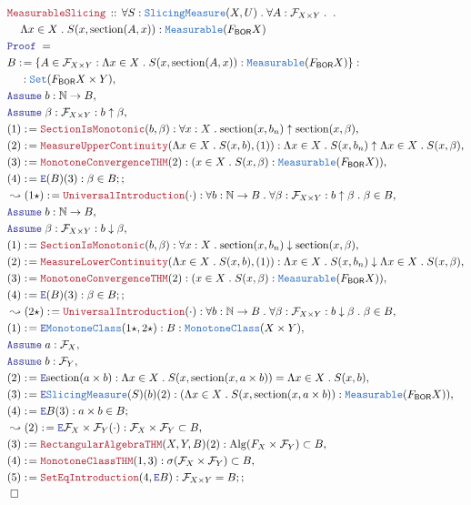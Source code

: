 \documentclass[12pt]{scrartcl}
\newcommand{\TYPE}[1]{\textcolor{NavyBlue}{\mathtt{#1}}}
\newcommand{\LOGIC}[1]{\textcolor{Blue}{\mathtt{#1}}}
\newcommand{\THM}[1]{\textcolor{Maroon}{\mathtt{#1}}}
\renewcommand{\.}{\; . \;}
\newcommand{\de}{: \kern 0.1pc =}
\newcommand{\Theorem}[2]{& \THM{#1} \, :: \, #2 \\ & \Proof = \\ }
\newcommand{\NewLine}{\\ & \kern 1pc}
\newcommand{\Page}[1]{ \begin{align*} #1 \end{align*}   }
\newcommand{\ForEach}[3]{\forall #1 : #2 \. #3 }
\newcommand{\Nat}{\mathbb{N} }
\newcommand{\Set}{\TYPE{Set}}
\newcommand{\Say}[3]{& #1 \de #2 : #3, \\}
\newcommand{\Conclude}[3]{& #1 \de #2 : #3; \\}
\newcommand{\Derive}[3]{& \leadsto #1 \de #2 : #3, \\}
\newcommand{\Assume}[2]{& \LOGIC{Assume} \; #1 : #2, \\}
\newcommand{\ByDef}{\LOGIC{E}}
\newcommand{\QED}{\; \square}
\newcommand{\EndProof}{& \QED \\}
\newcommand{\Proof}{\LOGIC{Proof} \; }
\newcommand{\BOR}{\mathsf{BOR}}
\newcommand{\F}{\mathcal{F}}
\begin{document}
\Page{
  \Theorem{MeasurableSlicing}{
 \ForEach{ S}{\TYPE{SlicingMeasure}(X,U)}{ 
 \ForEach{A}{ \F_{X \times Y} }{ \. \NewLine
   \Lambda x \in X \. S(x, \mathrm{section}(A,x)) : \TYPE{Measurable}(F_{\BOR}X)      
 }}}
 \Say{B}{ \{ A \in \F_{X \times Y} :  \Lambda x \in X \. S(x, \mathrm{section}(A,x)) : \TYPE{Measurable}(F_{\BOR}X)   \}}{
  \NewLine : 
 \Set (F_{\BOR}X \times Y)}
 \Assume{ b }{\Nat \to B}
 \Assume{ \beta }{ \F_{X \times Y} : b \uparrow \beta }
 \Say{(1)}{\THM{SectionIsMonotonic}(b,\beta)}
 {  \ForEach{x}{X}{  \mathrm{section}(x,b_n) \uparrow \mathrm{section}(x,\beta) }}
 \Say{(2)}{\THM{MeasureUpperContinuity}(\Lambda x \in X \. S(x,b),(1))}
 { \Lambda x \in X \. S(x, b_n) \uparrow \Lambda x \in X \. S(x, \beta)  }
 \Say{(3)}{\THM{MonotoneConvergenceTHM}(2)}
 { (x \in X \. S(x, \beta) : \TYPE{Measurable}(F_\BOR X) ) }
 \Conclude{(4)}{\ByDef(B)(3)}{ \beta \in B;}
 \Derive{(1\star)}{\THM{UniversalIntroduction}(\cdot)}
 {\ForEach{b}{  \Nat \to B}{\ForEach{\beta}{\F_{X \times Y} : b \uparrow \beta}}
 { \beta \in B } }
 \Assume{ b }{\Nat \to B}
 \Assume{ \beta }{ \F_{X \times Y} : b \downarrow \beta }
 \Say{(1)}{\THM{SectionIsMonotonic}(b,\beta)}
 {  \ForEach{x}{X}{  \mathrm{section}(x,b_n) \downarrow \mathrm{section}(x,\beta) }}
 \Say{(2)}{\THM{MeasureLowerContinuity}(\Lambda x \in X \. S(x,b),(1))}
 { \Lambda x \in X \. S(x, b_n) \downarrow \Lambda x \in X \. S(x, \beta)  }
 \Say{(3)}{\THM{MonotoneConvergenceTHM}(2)}
 { (x \in X \. S(x, \beta) : \TYPE{Measurable}(F_\BOR X) ) }
 \Conclude{(4)}{\ByDef(B)(3)}{ \beta \in B;}
 \Derive{(2\star)}{\THM{UniversalIntroduction}(\cdot)}
 {\ForEach{b}{  \Nat \to B}{\ForEach{\beta}{\F_{X \times Y} : b \downarrow \beta}}
 { \beta \in B } }
 \Say{(1)}{\ByDef\TYPE{MonotoneClass}(1\star,2\star)}
 { B : \TYPE{MonotoneClass}(X \times Y)}
 \Assume{a}{  \F_X}
 \Assume{b}{ \F_Y}
 \Say{(2)}{ \ByDef\mathrm{section}(a \times b) }
 { \Lambda x \in X \. S(x,\mathrm{section}(x,a \times b)) = \Lambda x \in X \. S(x,b)} 
 \Say{(3)}{ \ByDef\TYPE{SlicingMeasure}(S)(b)(2)}
 { ( \Lambda x \in X \. S(x,\mathrm{section}(x,a \times b)) : \TYPE{Measurable}( F_{\BOR}X) )}
 \Conclude{(4)}{\ByDef B (3)}{a \times b \in B}
 \Derive{(2)}{ \ByDef \F_X \times \F_Y(\cdot)}{\F_X \times \F_Y \subset B }
 \Say{(3)}{\THM{RectangularAlgebraTHM}(X,Y,B)(2)}{\mathrm{Alg}(F_X \times \F_Y) \subset B}
 \Say{(4)}{\THM{MonotoneClassTHM}(1,3)}{\sigma(\F_X \times \F_Y) \subset B}
 \Conclude{(5)}{\THM{SetEqIntroduction}(4,\ByDef B)}{ \F_{X \times Y} = B ;}
 \EndProof 
}
\newpage
\end{document}
